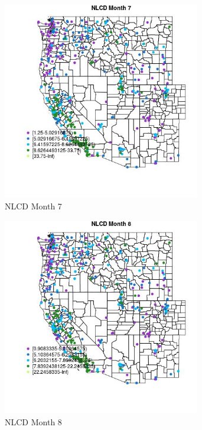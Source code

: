 \begin{figure} 
\centering  
\includegraphics[width=0.77\textwidth]{Code_Outputs/ML_input_report_ML_input_PM25_Step5_part_d_de_duplicated_aves_ML_input_MapObsMo7NLCD.jpg} 
\caption{\label{fig:ML_input_report_ML_input_PM25_Step5_part_d_de_duplicated_aves_ML_inputMapObsMo7NLCD}NLCD Month 7} 
\end{figure} 
 

\begin{figure} 
\centering  
\includegraphics[width=0.77\textwidth]{Code_Outputs/ML_input_report_ML_input_PM25_Step5_part_d_de_duplicated_aves_ML_input_MapObsMo8NLCD.jpg} 
\caption{\label{fig:ML_input_report_ML_input_PM25_Step5_part_d_de_duplicated_aves_ML_inputMapObsMo8NLCD}NLCD Month 8} 
\end{figure} 
 

